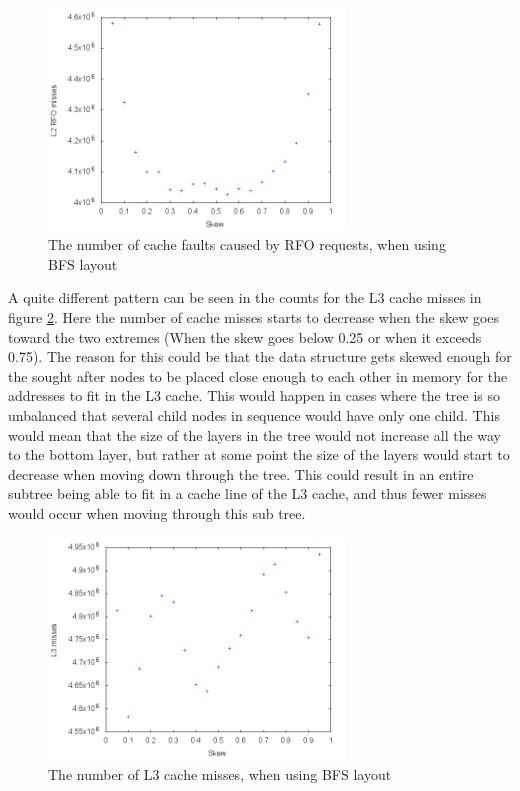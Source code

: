 \documentclass{article}
\begin{document}
\begin{figure}[H]
	\centering
	\includegraphics[width=0.7\textwidth]{figures/BFS_L2_RFO_misses}
	\caption{The number of cache faults caused by RFO requests, when using BFS layout}
	\label{fig:L2_RFO_misses_BFS}
\end{figure}

A quite different pattern can be seen in the counts for the L3 cache misses in figure \ref{fig:L3_misses_BFS}. Here the number of cache misses starts to decrease when the skew goes toward the two extremes (When the skew goes below 0.25 or when it exceeds 0.75). The reason for this could be that the data structure gets skewed enough for the sought after nodes to be placed close enough to each other in memory for the addresses to fit in the L3 cache. This would happen in cases where the tree is so unbalanced that several child nodes in sequence would have only one child. This would mean that the size of the layers in the tree would not increase all the way to the bottom layer, but rather at some point the size of the layers would start to decrease when moving down through the tree. This could result in an entire subtree being able to fit in a cache line of the L3 cache, and thus fewer misses would occur when moving through this sub tree.

\begin{figure}[H]
	\centering
	\includegraphics[width=0.7\textwidth]{figures/BFS_L3_misses}
	\caption{The number of L3 cache misses, when using BFS layout}
	\label{fig:L3_misses_BFS}
\end{figure}
\end{document}
